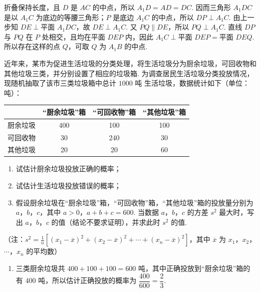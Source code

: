 \begin{problem}
\begin{solution}
\begin{enumerate}
折叠保持长度，且 \(D\) 是 \(AC\) 的中点，所以 \(A_1D=AD=DC\). 因而三角形 \(A_1DC\) 是以 \(A_1C\) 为底边的等腰三角形；\(P\) 是底边 \(A_1C\) 的中点，所以 \(DP\perp A_1C\). 由上一步知 \(DE\perp\text{平面 }A_1DC\)，故 \(DE\perp A_1C\). 又 \(PQ\parallel DE\)，所以 \(PQ\perp A_1C\). 直线 \(DP\) 与 \(PQ\) 在 \(P\) 处相交，且均在平面 \(DEP\) 内，因此 \(A_1C\perp\text{平面 }DEP=\text{平面 }DEQ\). 所以存在这样的点 \(Q\)，可取 \(Q\) 为 \(A_1B\) 的中点.
\end{enumerate}
\end{solution}
\end{problem}

\begin{problem}
近年来，某市为促进生活垃圾的分类处理，将生活垃圾分为厨余垃圾，可回收物和其他垃圾三类，并分别设置了相应的垃圾箱. 为调查居民生活垃圾分类投放情况，现随机抽取了该市三类垃圾箱中总计 \(1000\text{ 吨}\) 生活垃圾，数据统计如下（单位：吨）：

\begin{center}
\begin{tabular}{c|ccc}
 & “厨余垃圾”箱 & “可回收物”箱 & “其他垃圾”箱 \\
\hline
厨余垃圾 & 400 & 100 & 100 \\
可回收物 & 30 & 240 & 30 \\
其他垃圾 & 20 & 20 & 60
\end{tabular}
\end{center}

\begin{enumerate}
\item 试估计厨余垃圾投放正确的概率；
\item 试估计生活垃圾投放错误的概率；
\item 假设厨余垃圾在“厨余垃圾”箱，“可回收物”箱，“其他垃圾”箱的投放量分别为 \(a\)，\(b\)，\(c\)，其中 \(a > 0\)，\(a + b + c = 600\). 当数据 \(a\)，\(b\)，\(c\) 的方差 \(s^2\) 最大时，写出 \(a\)，\(b\)，\(c\) 的值（结论不要求证明），并求此时 \(s^2\) 的值.
\end{enumerate}

（注：\(s^2 = \frac{1}{n}\left[(x_1 - \overline{x})^2 + (x_2 - \overline{x})^2 + \cdots + (x_n - \overline{x})^2\right]\)，其中 \(\overline{x}\) 为 \(x_1\)，\(x_2\)，\(\cdots\)，\(x_n\) 的平均数）

\begin{solution}
\begin{enumerate}
\item 三类厨余垃圾共 \(400+100+100=600\) 吨，其中正确投放到“厨余垃圾”箱的有 \(400\) 吨，所以估计正确投放的概率为 \(\dfrac{400}{600}=\dfrac{2}{3}\).


\end{enumerate}
\end{solution}
\end{problem}
